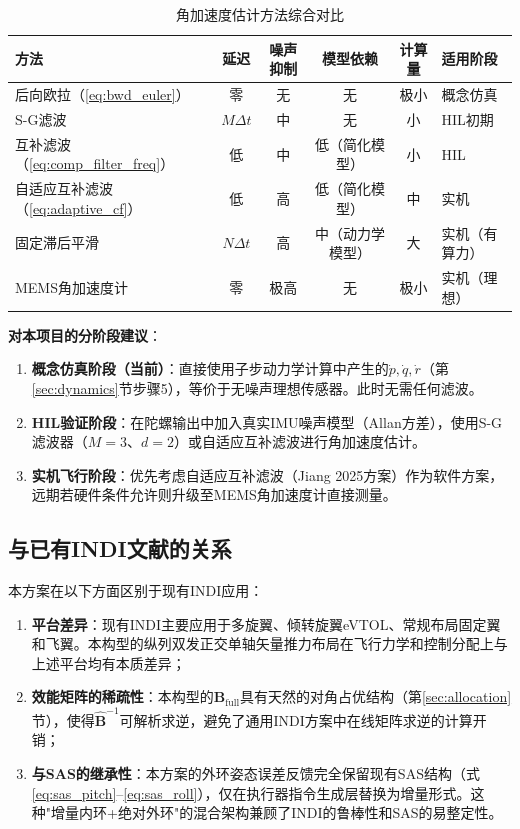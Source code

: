 \begin{table}[H]
\centering
\caption{角加速度估计方法综合对比}
\label{tab:accel_methods}
\setlength{\tabcolsep}{3pt}
\small
\begin{tabularx}{\textwidth}{>{\raggedright\arraybackslash}p{2.2cm} c c c c >{\raggedright\arraybackslash}X}
\toprule
\textbf{方法} & \textbf{延迟} & \textbf{噪声抑制} & \textbf{模型依赖} & \textbf{计算量} & \textbf{适用阶段} \\
\midrule
后向欧拉（\ref{eq:bwd_euler}） & 零 & 无 & 无 & 极小 & 概念仿真 \\
S-G滤波 & $M\Delta t$ & 中 & 无 & 小 & HIL初期 \\
互补滤波（\ref{eq:comp_filter_freq}） & 低 & 中 & 低（简化模型） & 小 & HIL \\
自适应互补滤波（\ref{eq:adaptive_cf}） & 低 & 高 & 低（简化模型） & 中 & 实机 \\
固定滞后平滑 & $N\Delta t$ & 高 & 中（动力学模型） & 大 & 实机（有算力） \\
MEMS角加速度计 & 零 & 极高 & 无 & 极小 & 实机（理想） \\
\bottomrule
\end{tabularx}
\end{table}

\textbf{对本项目的分阶段建议}：
\begin{enumerate}[label=(\arabic*)]
    \item \textbf{概念仿真阶段（当前）}：直接使用子步动力学计算中产生的$\dot{p},\dot{q},\dot{r}$（第\ref{sec:dynamics}节步骤5），等价于无噪声理想传感器。此时无需任何滤波。
    \item \textbf{HIL验证阶段}：在陀螺输出中加入真实IMU噪声模型（Allan方差），使用S-G滤波器（$M=3$、$d=2$）或自适应互补滤波进行角加速度估计。
    \item \textbf{实机飞行阶段}：优先考虑自适应互补滤波（Jiang 2025方案）作为软件方案，远期若硬件条件允许则升级至MEMS角加速度计直接测量。
\end{enumerate}

\subsection{与已有INDI文献的关系}

本方案在以下方面区别于现有INDI应用：
\begin{enumerate}[label=(\arabic*)]
    \item \textbf{平台差异}：现有INDI主要应用于多旋翼\cite{smeur2016incremental}、倾转旋翼eVTOL\cite{schlatter2024longitudinal,bhandari2024design}、常规布局固定翼\cite{grondman2018design}和飞翼\cite{jiang2026enhanced}。本构型的纵列双发正交单轴矢量推力布局在飞行力学和控制分配上与上述平台均有本质差异；
    \item \textbf{效能矩阵的稀疏性}：本构型的$\mathbf{B}_{\mathrm{full}}$具有天然的对角占优结构（第\ref{sec:allocation}节），使得$\hat{\mathbf{B}}^{-1}$可解析求逆，避免了通用INDI方案中在线矩阵求逆的计算开销；
    \item \textbf{与SAS的继承性}：本方案的外环姿态误差反馈完全保留现有SAS结构（式\ref{eq:sas_pitch}--\ref{eq:sas_roll}），仅在执行器指令生成层替换为增量形式。这种"增量内环+绝对外环"的混合架构兼顾了INDI的鲁棒性和SAS的易整定性。
\end{enumerate}
